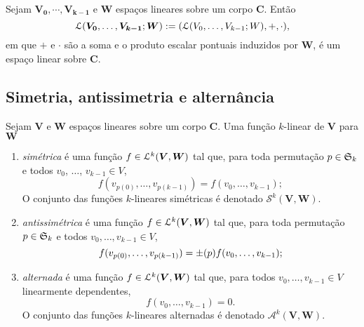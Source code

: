 \begin{proposition}
Sejam $\bm{V_0},\cdots,\bm{V_{k-1}}$ e $\bm W$ espaços lineares sobre um corpo $\bm C$. Então
	\begin{equation*}
	\mathcal{L}(\bm{V_0},\ldots,\bm{V_{k-1}};\bm W) := (\mathcal{L}(V_0,\ldots,V_{k-1};W),+,\cdot),
	\end{equation*}	
em que $+$ e $\cdot$ são a soma e o produto escalar pontuais induzidos por $\bm W$, é um espaço linear sobre $\bm C$.
\end{proposition}


\subsection{Simetria, antissimetria e alternância}

\begin{definition}
Sejam $\bm V$ e $\bm W$ espaços lineares sobre um corpo $\bm C$. Uma função $k$-linear de $\bm V$ para $\bm W$
\begin{enumerate}
	\item \emph{simétrica} é uma função $f \in \mathcal{L}^k(\bm V,\bm W)$ tal que, para toda permutação $p \in \mathfrak{S}_k$ e todos $v_0$, $\ldots$, $v_{k-1} \in V$,
	\begin{equation*}
	f(v_{p(0)},\ldots,v_{p(k-1)}) = f(v_0,\ldots,v_{k-1});
	\end{equation*}
O conjunto das funções $k$-lineares simétricas é denotado $\mathcal S^k(\bm V,\bm W)$.
	\item \emph{antissimétrica} é uma função $f \in \mathcal{L}^k(\bm V,\bm W)$ tal que, para toda permutação $p \in \mathfrak{S}_k$ e todos $v_0,\ldots,v_{k-1} \in V$,
	\begin{equation*}
	f(v_{p(0)},\ldots,v_{p(k-1)}) = \mathord{\pm}(p) f(v_0,\ldots,v_{k-1});
	\end{equation*}
	\item \emph{alternada} é uma função $f \in \mathcal{L}^k(\bm V,\bm W)$ tal que, para todos $v_0,\ldots,v_{k-1} \in V$ linearmente dependentes,
	\begin{equation*}
	f(v_0,\ldots,v_{k-1}) = 0.
	\end{equation*}
O conjunto das funções $k$-lineares alternadas é denotado $\mathcal A^k(\bm V,\bm W)$.
\end{enumerate}
\end{definition}

